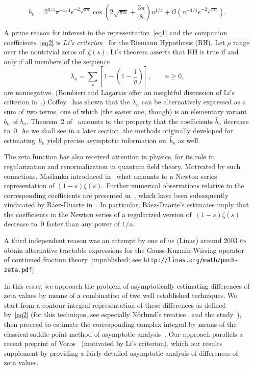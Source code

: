 \documentclass{amsart}
\def\hat{\widehat}
\begin{document}
\begin{equation}\label{asympform}
b_n =2^{3/4}\pi^{-1/4}e^{-2\sqrt{\pi n}}\cos\left(2\sqrt{\pi n}+\frac{3\pi}{8}\right)n^{1/4}
+\mathcal{O}\left(n^{-1/4} e^{-2\sqrt{\pi n}}\right).
\end{equation}


A prime reason for  interest in the representation~\eqref{eq1} and the
companion           coefficients~\eqref{eq2}         is     \emph{Li's
criterion}~\cite{Li97} for the   Riemann Hypothesis (RH).   Let $\rho$
range over the  nontrivial zeros of~$\zeta(s)$.   Li's theorem asserts
that RH is true if and only if all members of the sequence
\[
\lambda_n=\sum_\rho \left[1-\left(1-\frac{1}{\rho}\right)\right], \qquad n\ge0,
\]
are nonnegative. (Bombieri and Lagarias
 offer an insightful discussion of Li's criterion in~\cite{BoLa99}.) 
Coffey~\cite{Coffey05} has shown that the $\lambda_n$
can be alternatively  expressed as a  sum of  two terms, one  of which
(the easier one, though) is an elementary variant $\hat b_n$ of $b_n$.
Theorem~2 of~\cite{Coffey05}  amounts to the property that the coefficients $\hat b_n$ 
decrease to~0. As we shall see in a later section, 
the methods originally developed for estimating~$b_n$
yield precise asymptotic information on~$\hat b_n$ as well.

The zeta function has also received attention in physics,
for its role in regularization and renormalization in 
quantum field theory. 
Motivated by such connctions, 
Ma\'slanka introduced in~\cite{Maslanka01} 
what amounts to a Newton series representation of $(1-s)\zeta(s)$.
Further numerical observations relative to the corresponding coefficients
are presented in~\cite{Maslanka04}, which
have been subsequently vindicated by B\'aez-Duarte in~\cite{Baez03}.
In particular, B\'aez-Duarte's estimates imply that the coefficients
in the Newton series of a regularized version of~$(1-s)\zeta(s)$ decrease to~0
faster than any power of $1/n$.

A third independent reason was an attempt by one of us (Linas) around 2003 to obtain
alternative tractable expressions for the Gauss-Kuzmin-Wirsing operator of 
continued fraction theory [unpublished; see
\verb|http://linas.org/math/poch-zeta.pdf|]

In this essay,  we  approach the problem of  asymptotically estimating
differences of  zeta  values by means of   a combination  of  two well
established   techniques.   We   start   from   a   contour   integral
representation of these  differences as defined by~\eqref{eq2}  (for this
technique, see   especially N\"orlund's treatise~\cite{Norlund54}  and
the study~\cite{FlSe95}),  then proceed to estimate the corresponding
complex  integral by  means of the classical  saddle point method of asymptotic
analysis~\cite{deBruijn81,Olver74}. Our approach parallels a recent  preprint
of Voros~\cite{Voros05} (motivated by Li's criterion), 
which our results supplement by providing a fairly 
detailed asymptotic analysis of differences of zeta values.
\end{document}
